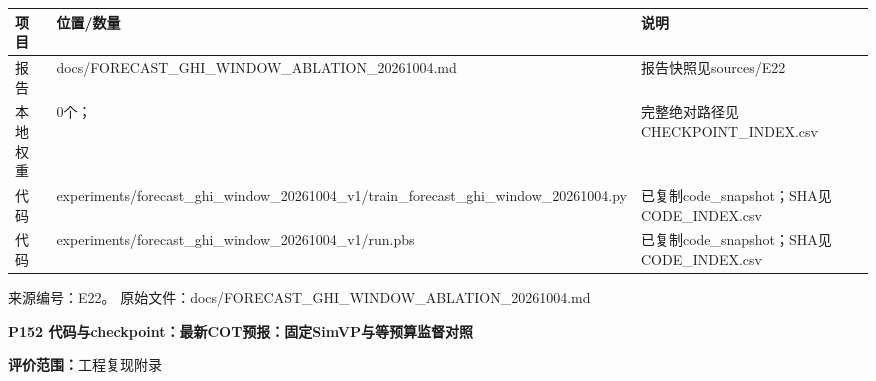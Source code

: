\documentclass[UTF8,a4paper,landscape,10pt]{ctexart}
\begin{document}
\begin{center}\small
\begin{adjustbox}{max totalheight=0.58\textheight,max width=\linewidth}
\begin{minipage}{\linewidth}\begin{tabularx}{\linewidth}{>{\hsize=0.3500\hsize\raggedright\arraybackslash}X>{\hsize=1.9000\hsize\raggedright\arraybackslash}X>{\hsize=0.7500\hsize\raggedright\arraybackslash}X}\toprule
\textbf{项目} & \textbf{位置/\allowbreak{}数量} & \textbf{说明} \\ \midrule
报告 & docs/\allowbreak{}FORECAST\_\allowbreak{}GHI\_\allowbreak{}WINDOW\_\allowbreak{}ABLATION\_\allowbreak{}20261004.md & 报告快照见sources/\allowbreak{}E22 \\
本地权重 & 0个； & 完整绝对路径见CHECKPOINT\_\allowbreak{}INDEX.csv \\
代码 & experiments/\allowbreak{}forecast\_\allowbreak{}ghi\_\allowbreak{}window\_\allowbreak{}20261004\_\allowbreak{}v1/\allowbreak{}train\_\allowbreak{}forecast\_\allowbreak{}ghi\_\allowbreak{}window\_\allowbreak{}20261004.py & 已复制code\_\allowbreak{}snapshot；SHA见CODE\_\allowbreak{}INDEX.csv \\
代码 & experiments/\allowbreak{}forecast\_\allowbreak{}ghi\_\allowbreak{}window\_\allowbreak{}20261004\_\allowbreak{}v1/\allowbreak{}run.pbs & 已复制code\_\allowbreak{}snapshot；SHA见CODE\_\allowbreak{}INDEX.csv \\
\bottomrule\end{tabularx}\end{minipage}\end{adjustbox}\end{center}
\vfill{\scriptsize\color{muted} 来源编号：E22。 原始文件：docs/\allowbreak{}FORECAST\_\allowbreak{}GHI\_\allowbreak{}WINDOW\_\allowbreak{}ABLATION\_\allowbreak{}20261004.md}\par
\clearpage
{\large\bfseries\color{ink} P152  代码与checkpoint：最新COT预报：固定SimVP与等预算监督对照}\par
{}\par
{\small\color{muted}\textbf{评价范围：}工程复现附录}\par\vspace{3mm}
\end{document}

